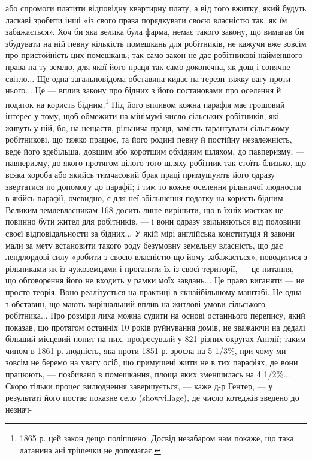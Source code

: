 \parcont{}  %
або спромоги платити відповідну квартирну плату, а від того
вжитку, який будуть ласкаві зробити інші «із свого права порядкувати
своєю власністю так, як їм забажається». Хоч би яка
велика була фарма, немає такого закону, що вимагав би збудувати
на ній певну кількість помешкань для робітників, не кажучи
вже зовсім про пристойність цих помешкань; так само
закон не дає робітникові найменшого права на ту землю, для якої
його праця так само доконечна, як дощ і сонячне світло... Ще
одна загальновідома обставина кидає на терези тяжку вагу проти
нього... Це — вплив закону про бідних з його постановами про
оселення й податок на користь бідним.\footnote{
1865 р. цей закон дещо поліпшено. Досвід незабаром нам покаже,
що така латанина ані трішечки не допомагає.
} Під його впливом кожна
парафія має грошовий інтерес у тому, щоб обмежити на мінімумі
число сільських робітників, які живуть у ній, бо, на нещастя,
рільнича праця, замість ґарантувати сільському робітникові,
що тяжко працює, та його родині певну й постійну незалежність,
веде його здебільша, довшим або коротшим обхідним
шляхом, до павперизму, — павперизму, до якого протягом цілого
того шляху робітник так стоїть близько, що всяка хороба
або якийсь тимчасовий брак праці примушують його одразу звертатися
по допомогу до парафії; і тим то кожне оселення рільничої
людности в якійсь парафії, очевидно, є для неї збільшення
податку на користь бідним. Великим землевласникам 168 досить
лише вирішити, що в їхніх маєтках не повинно бути жител для
робітників, — і вони одразу звільняються від половини своєї
відповідальности за бідних... У якій мірі англійська конституція
й закони мали за мету встановити такого роду безумовну
земельну власність, що дає лендлордові силу «робити з своєю
власністю що йому забажається», поводитися з рільниками
як із чужоземцями і проганяти їх із своєї території, — це питання,
що обговорення його не входить у рамки моїх завдань...
Це право виганяти — не просто теорія. Воно реалізується
на практиці в якнайбільшому маштабі. Це одна з обставин, що
мають вирішальний вплив на житлові умови сільського робітника...
Про розміри лиха можна судити на основі останнього
перепису, який показав, що протягом останніх 10 років руйнування
домів, не зважаючи на дедалі більший місцевий попит на
них, проґресувалй у 821 різних округах Англії; таким чином в
1861 р. людність, яка проти 1851 р. зросла на 5 1/3\%, при чому
ми зовсім не беремо на увагу осіб, що примушені жити не в тих
парафіях, де вони працюють, — позбивано в помешкання, площа
яких зменшилась на 4 1/2\%... Скоро тільки процес вилюднення
завершується, — каже д-р Гентер, — у результаті його постає
показне село (showvillage), де число котеджів зведено до незнач-

